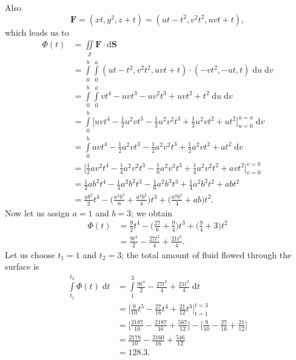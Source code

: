 \documentclass[10pt]{article}
\begin{document}
Also 
\[
\mathbf{F} = (xt, y^2, z + t) = (ut - t^2, v^2t^2, uvt + t),
\]
which leads us to 
\begin{align*}
\Phi(t) &= \iint\limits_{\mathcal{S}} \mathbf{F} \cdot \mathrm{d}\mathbf{S} \\
          &= \int\limits_0^b \int\limits_0^a (ut - t^2, v^2t^2, uvt + t) \cdot (-vt^2, -ut, t) \; \mathrm{d}u \; \mathrm{d}v \\
          &= \int\limits_0^b \int\limits_0^a vt^4 - uvt^3 - uv^2t^3 + uvt^2 + t^2 \; \mathrm{d}u \; \mathrm{d}v \\
          &= \int\limits_0^b  \Bigg[ uvt^4 - \frac{1}{2} u^2vt^3 - \frac{1}{2} u^2v^2t^3 + \frac{1}{2} u^2vt^2 + ut^2 \Bigg]_{u = 0}^{u = a}\; \mathrm{d}v \\
          &= \int\limits_0^b avt^4 - \frac{1}{2}a^2vt^3 - \frac{1}{2}a^2v^2t^3 + \frac{1}{2}a^2vt^2 + at^2 \; \mathrm{d}v \\
          &= \Bigg[ \frac{1}{2}av^2t^4 - \frac{1}{4}a^2v^2t^3 - \frac{1}{6}a^2v^3t^3 + \frac{1}{4}a^2v^2t^2 + avt^2 \Bigg]_{v = 0}^{v = b} \\
          &= \frac{1}{2}ab^2t^4 - \frac{1}{4}a^2b^2t^3 - \frac{1}{6}a^2b^3t^3 + \frac{1}{4}a^2b^2t^2 + abt^2 \\
          &= \frac{ab^2}{2} t^4 - \Bigg(\frac{a^2b^3}{6} + \frac{a^2b^2}{4}\Bigg)t^3 + \Bigg( \frac{a^2b^2}{4} + ab\Bigg)t^2.
\end{align*}
Now let us assign $a = 1$ and $b = 3$; we obtain
\begin{align*}
\Phi(t) &= \frac{9}{2}t^4 - \Bigg( \frac{27}{6} + \frac{9}{4}\Bigg)t^3 + \Bigg( \frac{9}{4} + 3\Bigg)t^2 \\
          &= \frac{9t^4}{2}  - \frac{27t^3}{4} + \frac{21t^2}{4}.
\end{align*}
Let us choose $t_1 = 1$ and $t_2 = 3$; the total amount of fluid flowed through the surface is
\begin{align*}
\int\limits_{t_1}^{t_2} \Phi(t) \; \mathrm{d} t &= \int\limits_1^3 \frac{9t^4}{2}  - \frac{27t^3}{4} + \frac{21t^2}{4} \; \mathrm{d}t \\
    &= \Bigg[ \frac{9}{10} t^5 - \frac{27}{16} t^4 + \frac{21}{12} t^3 \Bigg]_{t = 1}^{t = 3} \\
    &= \Bigg[ \frac{2187}{10} - \frac{2187}{16} + \frac{567}{12} \Bigg] - \Bigg[ \frac{9}{10} - \frac{27}{16} + \frac{21}{12} \Bigg] \\
    &= \frac{2178}{10} - \frac{2160}{16} + \frac{546}{12} \\
    &= 128.3.
\end{align*}
\end{document}
